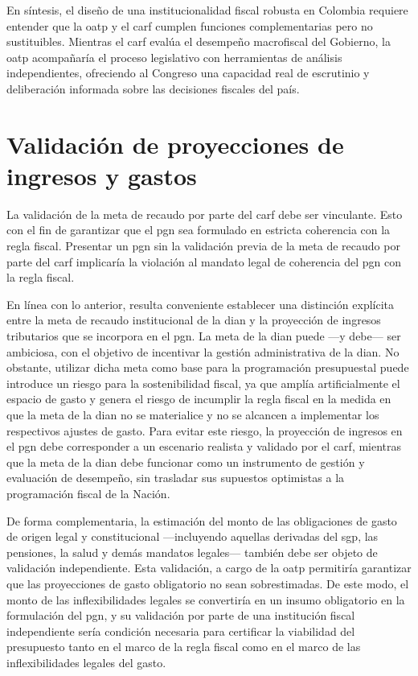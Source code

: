 En síntesis, el diseño de una institucionalidad fiscal robusta en Colombia requiere entender que la \gls{oatp} y el \gls{carf} cumplen funciones complementarias pero no sustituibles. Mientras el \gls{carf} evalúa el desempeño macrofiscal del Gobierno, la \gls{oatp} acompañaría el proceso legislativo con herramientas de análisis independientes, ofreciendo al Congreso una capacidad real de escrutinio y deliberación informada sobre las decisiones fiscales del país.

\section{Validación de proyecciones de ingresos y gastos}

La validación de la meta de recaudo por parte del \gls{carf} debe ser vinculante. Esto con el fin de garantizar que el \gls{pgn} sea formulado en estricta coherencia con la regla fiscal. Presentar un \gls{pgn} sin la validación previa de la meta de recaudo por parte del \gls{carf} implicaría la violación al mandato legal de coherencia del \gls{pgn} con la regla fiscal.  

En línea con lo anterior, resulta conveniente establecer una distinción explícita entre la meta de recaudo institucional de la \gls{dian} y la proyección de ingresos tributarios que se incorpora en el \gls{pgn}. La meta de la \gls{dian} puede —y debe— ser ambiciosa, con el objetivo de incentivar la gestión administrativa de la \gls{dian}. No obstante, utilizar dicha meta como base para la programación presupuestal puede introduce un riesgo para la sostenibilidad fiscal, ya que amplía artificialmente el espacio de gasto y genera el riesgo de incumplir la regla fiscal en la medida en que la meta de la \gls{dian} no se materialice y no se alcancen a implementar los respectivos ajustes de gasto. Para evitar este riesgo, la proyección de ingresos en el \gls{pgn} debe corresponder a un escenario realista y validado por el \gls{carf}, mientras que la meta de la \gls{dian} debe funcionar como un instrumento de gestión y evaluación de desempeño, sin trasladar sus supuestos optimistas a la programación fiscal de la Nación.

De forma complementaria, la estimación del monto de las obligaciones de gasto de origen legal y constitucional —incluyendo aquellas derivadas del \gls{sgp}, las pensiones, la salud y demás mandatos legales— también debe ser objeto de validación independiente. Esta validación, a cargo de la \gls{oatp} permitiría garantizar que las proyecciones de gasto obligatorio no sean sobrestimadas. De este modo, el monto de las inflexibilidades legales se convertiría en un insumo obligatorio en la formulación del \gls{pgn}, y su validación por parte de una institución fiscal independiente sería condición necesaria para certificar la viabilidad del presupuesto tanto en el marco de la regla fiscal como en el marco de las inflexibilidades legales del gasto.

